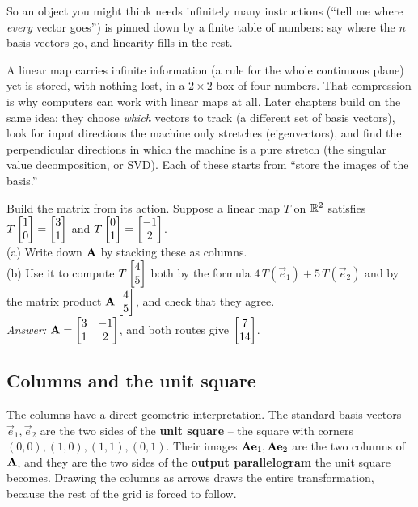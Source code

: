 So an object you might think
needs infinitely many instructions (``tell me where \emph{every} vector goes'')
is pinned down by a finite table of numbers: say where the $n$ basis
vectors go, and linearity fills in the rest.

\begin{aestheticbox}
A linear map carries infinite information (a rule for the whole continuous plane)
yet is stored, with nothing lost, in a $2\times 2$ box of four numbers.
That compression is why computers can work with linear maps at all. Later
chapters build on the same idea: they choose \emph{which} vectors to track (a
different set of basis vectors), look for input directions the machine only
stretches (eigenvectors), and find the perpendicular directions in which the
machine is a pure stretch (the singular value decomposition, or SVD). Each of
these starts from ``store the images of the basis.''
\end{aestheticbox}

\begin{labbox}
Build the matrix from its action. Suppose a linear map $T$ on $\mathbb{R}^2$ satisfies
$T\begin{bmatrix}1\\0\end{bmatrix} = \begin{bmatrix}3\\1\end{bmatrix}$ and $T\begin{bmatrix}0\\1\end{bmatrix} = \begin{bmatrix}-1\\2\end{bmatrix}$. \\[0.3em]
(a) Write down $\mathbf{A}$ by stacking these as columns. \\
(b) Use it to compute $T\begin{bmatrix}4\\5\end{bmatrix}$ both by the formula
$4\,T(\vec{e}_1) + 5\,T(\vec{e}_2)$ and by the matrix product $\mathbf{A}\begin{bmatrix}4\\5\end{bmatrix}$,
and check that they agree. \\[0.3em]
\emph{Answer:} $\mathbf{A} = \begin{bmatrix} 3 & -1 \\ 1 & 2\end{bmatrix}$, and both
routes give $\begin{bmatrix}7\\14\end{bmatrix}$.
\end{labbox}

\subsection{Columns and the unit square}

The columns have a direct geometric interpretation. The standard basis vectors $\vec{e}_1,
\vec{e}_2$ are the two sides of the \textbf{unit square} -- the square with
corners $(0,0), (1,0), (1,1), (0,1)$. Their images $\mathbf{A}\mathbf{e}_1,
\mathbf{A}\mathbf{e}_2$ are the two columns of $\mathbf{A}$, and they are the two sides of
the \textbf{output parallelogram} the unit square becomes. Drawing the columns as
arrows draws the entire transformation, because the rest of the grid is forced to
follow.


